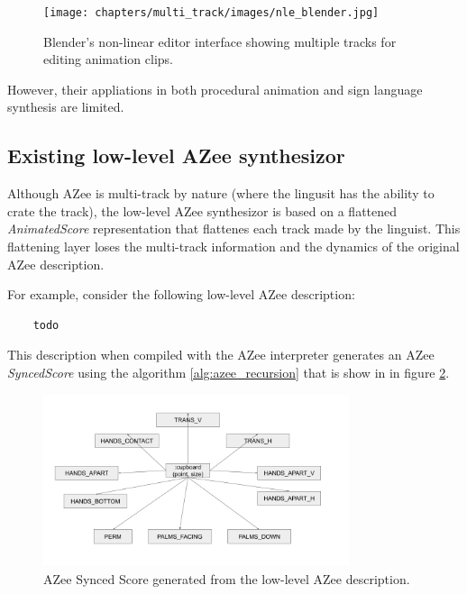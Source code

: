 \documentclass[../../main.tex]{subfiles}
\begin{document}
\begin{figure}[h]
    \centering
    \texttt{[image: chapters/multi\_track/images/nle\_blender.jpg]}
    \caption{Blender's non-linear editor interface showing multiple tracks for editing animation clips.}
    \label{fig:nle_blender}
\end{figure}

However, their appliations in both procedural animation and sign language synthesis are limited.

\subsection{Existing low-level AZee synthesizor}
\label{ch:multi_track:related_work:old_azee_synthesizor}

Although AZee is multi-track by nature (where the lingusit has the ability to crate the track), the low-level AZee synthesizor is based on a flattened \emph{AnimatedScore} representation that flattenes each track made by the linguist. This flattening layer loses the multi-track information and the dynamics of the original AZee description. 

For example, consider the following low-level AZee description:

\begin{verbatim}
    todo
\end{verbatim}

This description when compiled with the AZee interpreter generates an AZee \emph{SyncedScore} using the algorithm \ref{alg:azee_recursion} \cite{todo} that is show in in figure \ref{fig:azee_synced_score}.

\begin{figure}[h]
    \centering
    \includegraphics[width=0.8\textwidth]{chapters/multi_track/images/azee_synced_score.png}
    \caption{AZee Synced Score generated from the low-level AZee description.}
    \label{fig:azee_synced_score}
\end{figure}
\end{document}
